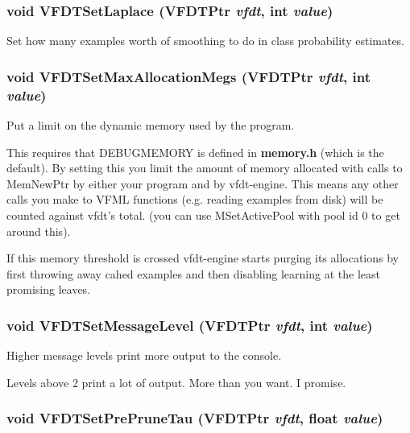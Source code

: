 \subsubsection{\setlength{\rightskip}{0pt plus 5cm}void VFDTSet\-Laplace ({\bf VFDTPtr} {\em vfdt}, int {\em value})}\label{vfdt-engine_8h_a13}


Set how many examples worth of smoothing to do in class probability estimates. 

\subsubsection{\setlength{\rightskip}{0pt plus 5cm}void VFDTSet\-Max\-Allocation\-Megs ({\bf VFDTPtr} {\em vfdt}, int {\em value})}\label{vfdt-engine_8h_a7}


Put a limit on the dynamic memory used by the program. 

This requires that DEBUGMEMORY is defined in {\bf memory.h} (which is the default). By setting this you limit the amount of memory allocated with calls to Mem\-New\-Ptr by either your program and by vfdt-engine. This means any other calls you make to VFML functions (e.g. reading examples from disk) will be counted against vfdt's total. (you can use MSet\-Active\-Pool with pool id 0 to get around this).

If this memory threshold is crossed vfdt-engine starts purging its allocations by first throwing away cahed examples and then disabling learning at the least promising leaves. 
\subsubsection{\setlength{\rightskip}{0pt plus 5cm}void VFDTSet\-Message\-Level ({\bf VFDTPtr} {\em vfdt}, int {\em value})}\label{vfdt-engine_8h_a6}


Higher message levels print more output to the console. 

Levels above 2 print a lot of output. More than you want. I promise. 
\subsubsection{\setlength{\rightskip}{0pt plus 5cm}void VFDTSet\-Pre\-Prune\-Tau ({\bf VFDTPtr} {\em vfdt}, float {\em value})}\label{vfdt-engine_8h_a12}


